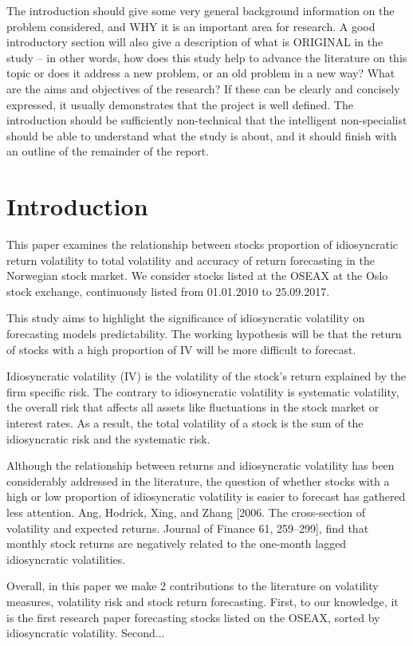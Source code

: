 The introduction should give some very general background information on the problem considered, and WHY it is an important area for research. A good introductory section will also give a description of what is ORIGINAL in the study – in other words, how does this study help to advance the literature on this topic or does it address a new problem, or an old problem in a new way? What are the aims and objectives of the research? If these can be clearly and concisely expressed, it usually demonstrates that the project is well defined. The introduction should be sufficiently non-technical that the intelligent non-specialist should be able to understand what the study is about, and it should finish with an outline of the remainder of the report. 

\chapter{Introduction}
This paper examines the relationship between stocks proportion of idiosyncratic return volatility to total volatility and accuracy of return forecasting in the Norwegian stock market. We consider stocks listed at the OSEAX at the Oslo stock exchange, continuously listed from 01.01.2010 to 25.09.2017. 

This study aims to highlight the significance of idiosyncratic volatility on forecasting models predictability. The working hypothesis will be that the return of stocks with a high proportion of IV will be more difficult to forecast. 
 
Idiosyncratic volatility (IV) is the volatility of the stock's return explained by the firm specific risk. The contrary to idiosyncratic volatility is systematic volatility, the overall risk that affects all assets like fluctuations in the stock market or interest rates. As a result, the total volatility of a stock is the sum of the idiosyncratic risk and the systematic risk. 

Although  the  relationship between returns and idiosyncratic volatility has been  considerably addressed  in the  literature, the question of whether stocks with a high or low proportion of idiosyncratic volatility is easier to forecast has gathered less attention. Ang, Hodrick, Xing, and Zhang [2006. The cross-section of volatility and expected returns. Journal of Finance 61, 259–299], find that monthly stock returns are negatively related to the one-month lagged idiosyncratic volatilities.

Overall, in this paper we make 2 contributions to the literature  on  volatility  measures, volatility  risk and  stock  return forecasting.  First,  to our knowledge, it  is  the first research paper forecasting stocks listed on the OSEAX, sorted by idiosyncratic volatility. Second...

